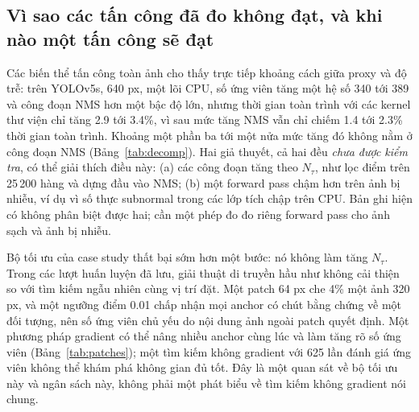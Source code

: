 \documentclass[a4paper,fleqn]{cas-dc}
\newcommand{\Ntau}{N_{\tau}}
\begin{document}
\subsection{Vì sao các tấn công đã đo không đạt, và khi nào một tấn công sẽ đạt}
Các biến thể tấn công toàn ảnh cho thấy trực tiếp khoảng cách giữa proxy và độ trễ: trên YOLOv5s, 640 px, một lõi CPU, số ứng viên tăng một hệ số 340 tới 389 và công đoạn NMS hơn một bậc độ lớn, nhưng thời gian toàn trình với các kernel thư viện chỉ tăng 2.9 tới 3.4\%, vì sau mức tăng NMS vẫn chỉ chiếm 1.4 tới 2.3\% thời gian toàn trình. Khoảng một phần ba tới một nửa mức tăng đó không nằm ở công đoạn NMS (Bảng~\ref{tab:decomp}). Hai giả thuyết, cả hai đều \emph{chưa được kiểm tra}, có thể giải thích điều này: (a) các công đoạn tăng theo $\Ntau$, như lọc điểm trên 25\,200 hàng và dựng đầu vào NMS; (b) một forward pass chậm hơn trên ảnh bị nhiễu, ví dụ vì số thực subnormal trong các lớp tích chập trên CPU. Bản ghi hiện có không phân biệt được hai; cần một phép đo đo riêng forward pass cho ảnh sạch và ảnh bị nhiễu.

Bộ tối ưu của case study thất bại sớm hơn một bước: nó không làm tăng $\Ntau$. Trong các lượt huấn luyện đã lưu, giải thuật di truyền hầu như không cải thiện so với tìm kiếm ngẫu nhiên cùng vị trí đặt. Một patch 64 px che 4\% một ảnh 320 px, và một ngưỡng điểm 0.01 chấp nhận mọi anchor có chút bằng chứng về một đối tượng, nên số ứng viên chủ yếu do nội dung ảnh ngoài patch quyết định. Một phương pháp gradient có thể nâng nhiều anchor cùng lúc và làm tăng rõ số ứng viên (Bảng~\ref{tab:patches}); một tìm kiếm không gradient với 625 lần đánh giá ứng viên không thể khám phá không gian đủ tốt. Đây là một quan sát về bộ tối ưu này và ngân sách này, không phải một phát biểu về tìm kiếm không gradient nói chung.
\end{document}
